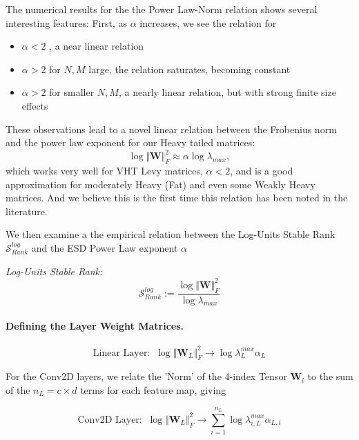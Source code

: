 The numerical results for the the Power Law-Norm relation shows several interesting features: 
First, as $\alpha$ increases, we see the relation for
\begin{itemize}
\item  $\alpha<2$ , a near linear relation 
\item  $\alpha>2$ for $N,M$ large, the relation saturates, becoming constant
\item   $\alpha>2$  for smaller $N,M$,  a nearly linear relation, but with strong finite size effects
\end{itemize}
These observations lead to a novel linear relation between the Frobenius norm and the power law exponent for our Heavy tailed matrices:
$$
\log\Vert\mathbf{W}\Vert^{2}_{F}\approx\alpha\log\lambda_{max}  ,
$$
which works very well for VHT Levy matrices, $\alpha<2$, and is a good approximation for moderately Heavy (Fat) and even some Weakly Heavy matrices. 
And we believe this is the first time this relation has been noted in the literature.


We then examine a the empirical relation between  the Log-Units Stable Rank 
$\mathcal{S}^{log}_{Rank}$ and the ESD Power Law exponent $\alpha$

\emph{Log-Units Stable Rank:  } 
$$\mathcal{S}^{log}_{Rank}:=\dfrac{\log\Vert\mathbf{W}\Vert^{2}_{F}}{\log\lambda_{max}}$$



\paragraph{Defining the Layer Weight Matrices.} 


$$\text{Linear Layer:}\;\;\log\Vert\mathbf{W}_{L}\Vert^{2}_{F}\rightarrow\log\lambda^{max}_{L}\alpha_{L}$$

For the Conv2D layers, we relate the 'Norm' of the 4-index Tensor $\mathbf{W}_{l}$ to the sum of the $n_{L}=c\times d$ terms for each feature map, giving 

$$\text{Conv2D Layer:}\;\;\log\Vert\mathbf{W}_{L}\Vert^{2}_{F}\rightarrow \sum_{i=1}^{n_{L}}\log\lambda^{max}_{i,L}\alpha_{L,i}$$

